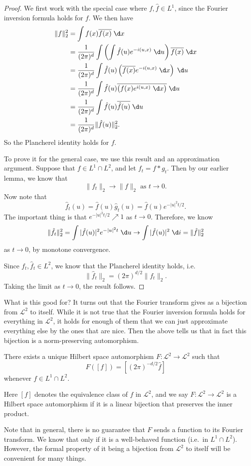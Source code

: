 \documentclass[a4paper]{article}
\begin{document}
\begin{proof}
  We first work with the special case where $f, \hat{f} \in L^1$, since the Fourier inversion formula holds for $f$. We then have
  \begin{align*}
    \|f\|_2^2 &= \int f(x) \overline{f(x)}\;\d x\\
    &= \frac{1}{(2\pi)^d} \int \left(\int \hat{f}(u) e^{-i(u, x)}\;\d u\right)\overline{f(x)}\;\d x\\
    &= \frac{1}{(2\pi)^d} \int \hat{f}(u) \left(\overline{f(x)} e^{-i(u, x)}\;\d x\right) \;\d u\\
    &= \frac{1}{(2\pi)^d} \int \hat{f}(u) \overline{\left(f(x) e^{i(u, x)}\;\d x\right)} \;\d u\\
    &= \frac{1}{(2\pi)^d} \int \hat{f}(u) \overline{\hat{f}(u)} \;\d u\\
    &= \frac{1}{(2\pi)^d} \|\hat{f}(u)\|_2^2.
  \end{align*}
  So the Plancherel identity holds for $f$.

  To prove it for the general case, we use this result and an approximation argument. Suppose that $f \in L^1 \cap L^2$, and let $f_t = f * g_t$. Then by our earlier lemma, we know that
  \[
    \|f_t\|_2 \to \|f\|_2\text{ as }t \to 0.
  \]
  Now note that
  \[
    \hat{f}_t(u) = \hat{f}(u)\hat{g}_t(u) = \hat{f}(u) e^{-|u|^2 t/2}.
  \]
  The important thing is that $e^{-|u|^2 t/2} \nearrow 1$ as $t \to 0$. Therefore, we know
  \[
    \|\hat{f}_t \|_2^2 = \int |\hat{f}(u)|^2 e^{-|u|^2 t}\; \d u \to \int |\hat{f}(u)|^2 \;\d i = \|\hat{f}\|_2^2
  \]
  as $t \to 0$, by monotone convergence.

  Since $f_t, \hat{f}_t \in L^2$, we know that the Plancherel identity holds, i.e.
  \[
    \|\hat{f}_t\|_2 = (2\pi)^{d/2} \|f_t\|_2.
  \]
  Taking the limit as $t \to 0$, the result follows.
\end{proof}

What is this good for? It turns out that the Fourier transform gives as a bijection from $\mathcal{L}^2$ to itself. While it is not true that the Fourier inversion formula holds for everything in $\mathcal{L}^2$, it holds for enough of them that we can just approximate everything else by the ones that are nice. Then the above tells us that in fact this bijection is a norm-preserving automorphism.

\begin{thm}
  There exists a unique Hilbert space automorphism $F: \mathcal{L}^2 \to \mathcal{L}^2$ such that
  \[
    F([f]) = [(2\pi)^{-d/2}\hat{f}]
  \]
  whenever $f \in L^1 \cap L^2$.

  Here $[f]$ denotes the equivalence class of $f$ in $\mathcal{L}^2$, and we say $F: \mathcal{L}^2 \to \mathcal{L}^2$ is a Hilbert space automorphism if it is a linear bijection that preserves the inner product.
\end{thm}
Note that in general, there is no guarantee that $F$ sends a function to its Fourier transform. We know that only if it is a well-behaved function (i.e.\ in $L^1 \cap L^2$). However, the formal property of it being a bijection from $\mathcal{L}^2$ to itself will be convenient for many things.
\end{document}
